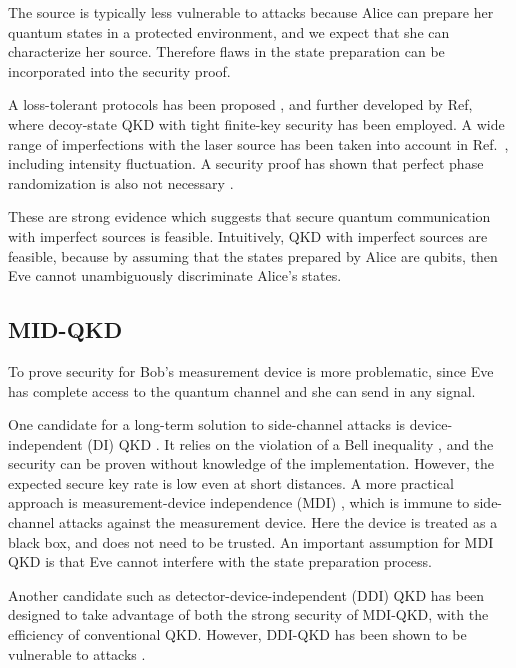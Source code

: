 The source is typically less vulnerable to attacks because Alice can prepare her quantum states in
a protected environment, and we expect that she can characterize her source. Therefore flaws in the state preparation can be incorporated into the security proof.


A loss-tolerant protocols has been proposed \cite{PhysRevA.90.052314}, and further developed by Ref\cite{PhysRevA.92.032305}, where
decoy-state QKD with tight finite-key security has been employed. A wide range of imperfections with the laser source has been taken into account in Ref.~\cite{mizutani2015finite}, including intensity fluctuation.  A security proof has shown that perfect phase randomization is also not necessary \cite{cao2015discrete}.


These are strong evidence which suggests that secure quantum communication with imperfect sources is feasible\cite{diamanti2016practical}. Intuitively, QKD with imperfect sources are feasible, because by assuming that the states prepared by Alice are qubits, then Eve cannot unambiguously discriminate Alice's states\cite{diamanti2016practical}. 



\subsection{MID-QKD}

To prove security for Bob's measurement device is more problematic, since Eve has complete access to the quantum channel and she can send in any signal. 

One candidate for a long-term solution to side-channel attacks is device-independent (DI) QKD \cite{PhysRevLett.98.230501}. It relies on the violation of a Bell inequality \cite{hensen2015loophole}, and the security can be proven without knowledge of the implementation. However, the expected secure key rate is low even at short distances. A more practical approach is measurement-device independence (MDI) \cite{PhysRevLett.108.130503}, which is immune to side-channel attacks against the measurement device. Here the device is treated as a black box, and does not need to be trusted. An important assumption for MDI QKD is that Eve cannot interfere with the state preparation process. 

Another candidate such as 
detector-device-independent\cite{lim2014detector,PhysRevA.92.022337} (DDI) QKD has been designed to take advantage of both the strong security of MDI-QKD, with the efficiency of conventional QKD. However, DDI-QKD has been shown to be vulnerable to attacks \cite{PhysRevLett.117.250505}. 


